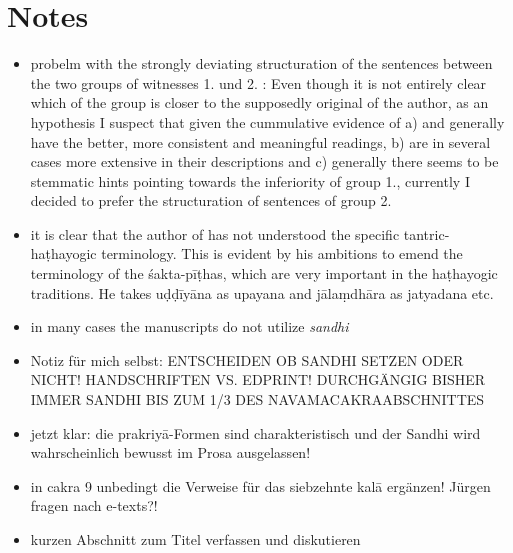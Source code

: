 \documentclass[11pt,showtrims]{memoir}
\begin{document}
\section{Notes}
\begin{itemize}
\item probelm with the strongly deviating structuration of the sentences between the two groups of witnesses 1. \edprint \pune \lalchand \oxford und 2. \nepal \dehlia: Even though it is not entirely clear which of the group is closer to the supposedly original of the author, as an hypothesis I suspect that given the cummulative evidence of a) \nepal and \dehlia generally have the better, more consistent and meaningful readings, b) are in several cases more extensive in their descriptions and c) generally there seems to be stemmatic hints pointing towards the inferiority of group 1., currently I decided to prefer the structuration of sentences of group 2.
\item it is clear that the author of \edprint has not understood the specific tantric-haṭhayogic terminology. This is evident by his ambitions to emend the terminology of the śakta-pīṭhas, which are very important in the haṭhayogic traditions. He takes uḍḍīyāna as upayana and jālaṃdhāra as jatyadana etc.
\item in many cases the manuscripts do not utilize \textit{sandhi}
\item Notiz für mich selbst: ENTSCHEIDEN OB SANDHI SETZEN ODER NICHT! HANDSCHRIFTEN VS. EDPRINT! DURCHGÄNGIG BISHER IMMER SANDHI BIS ZUM 1/3 DES NAVAMACAKRAABSCHNITTES
\item jetzt klar: die prakriyā-Formen sind charakteristisch und der Sandhi wird wahrscheinlich bewusst im Prosa ausgelassen!
\item in cakra 9 unbedingt die Verweise für das siebzehnte kalā ergänzen! Jürgen fragen nach e-texts?!
\item kurzen Abschnitt zum Titel verfassen und diskutieren 
\end{itemize}
\end{document}
